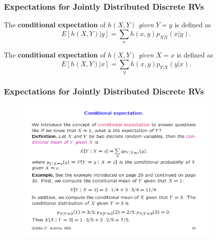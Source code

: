 \documentclass[notes=show,handout]{beamer}
\begin{document}
\begin{frame}%

\frametitle{Expectations for Jointly Distributed Discrete RVs}

\begin{definition}
The \textbf{conditional expectation }of $h\left( X,Y\right) $ 
\emph{given} $Y=y$ is defined as%
\begin{equation*}
E\left[ h\left( X,Y\right) |y\right] =\sum_{x}h\left( x,y\right)
p_{X|Y}\left( x|y\right).
\end{equation*}

The \textbf{conditional expectation }of $h\left( X,Y\right) $ 
\emph{given} $X=x$ is defined as%
\begin{equation*}
E\left[ h\left( X,Y\right) |x\right] =\sum_{y}h\left( x,y\right)
p_{Y|X}\left( y|x\right).
\end{equation*}
\end{definition}

\end{frame}%



\begin{frame}
\frametitle{Expectations for Jointly Distributed Discrete RVs}
\begin{example}
\begin{figure}[ptb]\centering
\includegraphics[width=0.9\textwidth,height=0.4\textheight]{ex_cond_audrins.pdf}
\end{figure}
\end{example}
\end{frame}
\end{document}
